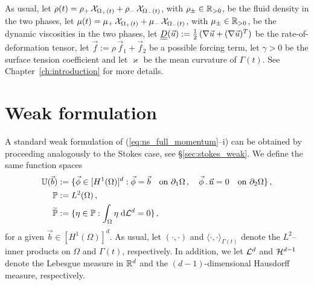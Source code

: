 As usual, let $\rho(t) = \rho_+\,\mathrm{\mathcal{X}}_{\Omega_+(t)}+
\rho_-\,\mathrm{\mathcal{X}}_{\Omega_-(t)}$, with $\rho_\pm \in \mathbb R_{>0}$, be the fluid
density in the two phases, let $\mu(t) = \mu_+\,\mathrm{\mathcal{X}}_{\Omega_+(t)} +
\mu_-\,\mathrm{\mathcal{X}}_{\Omega_-(t)}$, with $\mu_\pm \in \mathbb R_{>0}$, be the dynamic
viscosities in the two phases, let $\mat D(\vec u):=\frac12\, (\nabla\vec
u+(\nabla\vec u)^T)$ be the rate-of-deformation tensor, let
$\vec f:=\rho\,\vec f_1+\vec f_2$ be a possible forcing term, let $\gamma>0$ be
the surface tension coefficient and let $\varkappa$ be the mean curvature of
$\Gamma(t)$. See Chapter~\ref{ch:introduction} for more details.

\section{Weak formulation}\label{sec:ns_weak}
A standard weak formulation of (\ref{eq:ns_full_momentum}--i) can be obtained
by proceeding analogously to the Stokes case, see \S\ref{sec:stokes_weak}. We
define the same function spaces
\begin{align*}
\mathbb{U}(\vec{b}) &:= \{\vec \phi\in[H^1(\Omega)]^d:
\vec \phi =\vec b\quad \mbox{on }\partial_1\Omega\,,
\quad \vec \phi\,.\,\vec{\rm n}=0 \quad \mbox{on }\partial_2\Omega\}\,,\\
\mathbb{P} &:= L^2(\Omega)\,,\\
\widetilde{\mathbb{P}} &:= \{\eta\in\mathbb{P} : \int_\Omega\eta\;{\rm d}{\cal L}^{d}=0 \}\,,
\end{align*}
for a given $\vec b \in [H^1(\Omega)]^d$. As usual, let $(\cdot,\cdot)$ and
$\langle \cdot, \cdot \rangle_{\Gamma(t)}$ denote the $L^2$--inner products on
$\Omega$ and $\Gamma(t)$, respectively. In addition, we let $\mathcal{L}^d$ and
$\mathcal{H}^{d-1}$ denote the Lebesgue measure in $\mathbb R^d$ and the $(d-1)$-dimensional
Hausdorff measure, respectively.

